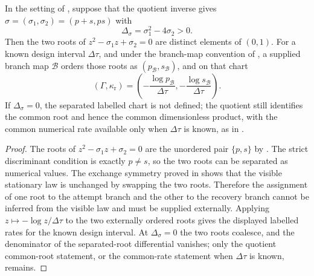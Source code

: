 \begin{proposition}\label{prop:population-separated-root-labelled-chart-main}
In the setting of , suppose that the
quotient inverse gives
\(\sigma=(\sigma_1,\sigma_2)=(p+s,ps)\) with
\[
\Delta_\sigma=\sigma_1^2-4\sigma_2>0 .
\]
Then the two roots of \(z^2-\sigma_1z+\sigma_2=0\) are distinct elements of
\((0,1)\).  For a known design interval \(\Delta\tau\), and under the
branch-map convention of
, a supplied branch map
\(\mathcal B\) orders those roots as \((p_{\mathcal B},s_{\mathcal B})\), and
on that chart
\[
(\Gamma,\kappa_{\mathrm r})
=\left(-\frac{\log p_{\mathcal B}}{\Delta\tau},
       -\frac{\log s_{\mathcal B}}{\Delta\tau}\right).
\]
If \(\Delta_\sigma=0\), the separated labelled chart is not defined; the
quotient still identifies the common root and hence the common dimensionless
product, with the common numerical rate available only when \(\Delta\tau\) is
known, as in .
\end{proposition}

\begin{proof}
The roots of \(z^2-\sigma_1z+\sigma_2=0\) are the unordered pair
\(\{p,s\}\) by .  The strict
discriminant condition is exactly \(p\ne s\), so the two roots can be
separated as numerical values.  The exchange symmetry proved in
 shows that the visible stationary
law is unchanged by swapping the two roots.  Therefore the assignment of one
root to the attempt branch and the other to the recovery branch cannot be
inferred from the visible law and must be supplied externally.  Applying
\(z\mapsto-\log z/\Delta\tau\) to the two externally ordered roots gives the
displayed labelled rates for the known design interval.  At
\(\Delta_\sigma=0\) the two roots coalesce, and the denominator of the
separated-root differential vanishes; only the quotient common-root statement,
or the common-rate statement when \(\Delta\tau\) is known, remains.
\end{proof}

